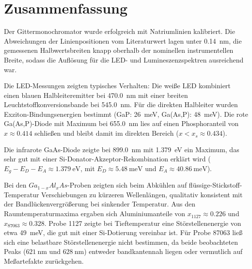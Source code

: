 \documentclass{article}
\begin{document}
\section{Zusammenfassung}

Der Gittermonochromator wurde erfolgreich mit Natriumlinien kalibriert. Die Abweichungen der Linienpositionen vom Literaturwert lagen unter \SI{0.14}{\nano\meter}, die gemessenen Halbwertsbreiten knapp oberhalb der nominellen instrumentellen Breite, sodass die Auflösung für die LED- und Lumineszenzspektren ausreichend war.

Die LED-Messungen zeigten typisches Verhalten: Die weiße LED kombiniert einen blauen Halbleiteremitter bei \SI{470.0}{\nano\meter} mit einer breiten Leuchtstoffkonversionsbande bei \SI{545.0}{\nano\meter}. Für die direkten Halbleiter wurden Exziton-Bindungsenergien bestimmt (GaP: \SI{26}{\milli\electronvolt}, Ga(As,P): \SI{48}{\milli\electronvolt}). Die rote Ga(As,P)-Diode mit Maximum bei \SI{655.0}{\nano\meter} lies auf einen Phosphoranteil von $x\approx0.414$ schließen und bleibt damit im direkten Bereich ($x<x_s\approx0.434$).

Die infrarote GaAs-Diode zeigte bei \SI{899.0}{\nano\meter} mit \SI{1.379}{\electronvolt} ein Maximum, das sehr gut mit einer Si-Donator-Akzeptor-Rekombination erklärt wird ($E_g-E_D-E_A\approx\SI{1.379}{\electronvolt}$, mit $E_D\approx\SI{5.48}{\milli\electronvolt}$ und $E_A\approx\SI{40.86}{\milli\electronvolt}$).

Bei den $Ga_{1-x}Al_xAs$-Proben zeigten sich beim Abkühlen auf flüssige-Stickstoff-Temperatur Verschiebungen zu kürzeren Wellenlängen, qualitativ konsistent mit der Bandlückenvergrößerung bei sinkender Temperatur. Aus den Raumtemperaturmaxima ergaben sich Aluminiumanteile von $x_{1127}\approx0.226$ und $x_{87063}\approx0.328$. Probe 1127 zeigte bei Tieftemperatur eine Störstellenenergie von etwa \SI{49}{\milli\electronvolt}, die gut mit einer Si-Dotierung vereinbar ist. Für Probe 87063 ließ sich eine belastbare Störstellenenergie nicht bestimmen, da beide beobachteten Peaks ($\SI{621}{\nano\meter}$ und $\SI{628}{\nano\meter}$) entweder bandkantennah liegen oder vermutlich auf Meßartefakte zurückgehen.

\newpage
\listoffigures
\listoftables
\printbibliography
\end{document}
